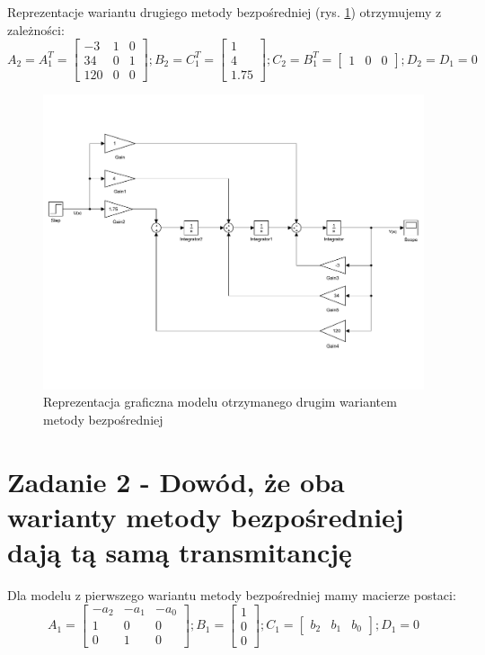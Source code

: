 \documentclass{article}
\begin{document}
Reprezentacje wariantu drugiego metody bezpośredniej (rys. \ref{fig:z12}) otrzymujemy z zależności:
\[A_2 = A_1^T = \begin{bmatrix} -3 & 1 & 0\\ 34 & 0 & 1\\ 120 & 0 & 0 \end{bmatrix};
B_2 = C_1^T = \begin{bmatrix}  1\\ 4\\ 1.75 \end{bmatrix};
C_2 = B_1^T = \begin{bmatrix} 1 & 0 & 0 \end{bmatrix};
D_2 = D_1 = 0
\]
\begin{figure}
\centering
\includegraphics[width=0.9\linewidth]{Z1_2}
\caption{Reprezentacja graficzna modelu otrzymanego drugim wariantem metody bezpośredniej}
\label{fig:z12}
\end{figure}

\section{Zadanie 2 - Dowód, że oba warianty metody bezpośredniej dają tą samą transmitancję}
Dla modelu z pierwszego wariantu metody bezpośredniej mamy macierze postaci:
\[A_1 = \begin{bmatrix} -a_2 & -a_1 & -a_0\\ 1 & 0 & 0\\ 0 & 1 & 0 \end{bmatrix};
B_1 = \begin{bmatrix} 1\\ 0\\ 0 \end{bmatrix};
C_1 = \begin{bmatrix} b_2 & b_1 & b_0 \end{bmatrix};
D_1 = 0
\]
\end{document}
